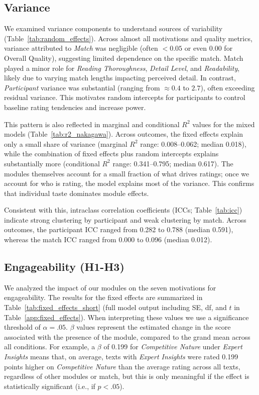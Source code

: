 \subsection{Variance}
We examined variance components to understand sources of variability (Table~\ref{tab:random_effects}). Across almost all motivations and quality metrics, variance attributed to \textit{Match} was negligible (often $< 0.05$ or even $0.00$ for Overall Quality), suggesting limited dependence on the specific match. Match played a minor role for \textit{Reading Thoroughness}, \textit{Detail Level}, and \textit{Readability}, likely due to varying match lengths impacting perceived detail. In contrast, \textit{Participant} variance was substantial (ranging from $\approx 0.4$ to $2.7$), often exceeding residual variance. This motivates random intercepts for participants to control baseline rating tendencies and increase power.

This pattern is also reflected in marginal and conditional $R^2$ values for the mixed models (Table~\ref{tab:r2_nakagawa}). Across outcomes, the fixed effects explain only a small share of variance (marginal $R^2$ range: 0.008--0.062; median 0.018), while the combination of fixed effects plus random intercepts explains substantially more (conditional $R^2$ range: 0.341--0.795; median 0.617). The modules themselves account for a small fraction of what drives ratings; once we account for who is rating, the model explains most of the variance. This confirms that individual taste dominates module effects.

Consistent with this, intraclass correlation coefficients (ICCs; Table~\ref{tab:icc}) indicate strong clustering by participant and weak clustering by match. Across outcomes, the participant ICC ranged from 0.282 to 0.788 (median 0.591), whereas the match ICC ranged from 0.000 to 0.096 (median 0.012).

\subsection{Engageability (H1-H3)}
We analyzed the impact of our modules on the seven motivations for engageability. The results for the fixed effects are summarized in Table~\ref{tab:fixed_effects_short} (full model output including SE, df, and $t$ in Table~\ref{app:fixed_effects}). When interpreting these values we use a significance threshold of $\alpha = .05$. $\beta$ values represent the estimated change in the score associated with the presence of the module, compared to the grand mean across all conditions. For example, a $\beta$ of 0.199 for \textit{Competitive Nature} under \textit{Expert Insights} means that, on average, texts with \textit{Expert Insights} were rated 0.199 points higher on \textit{Competitive Nature} than the average rating across all texts, regardless of other modules or match, but this is only meaningful if the effect is statistically significant (i.e., if $p < .05$).

